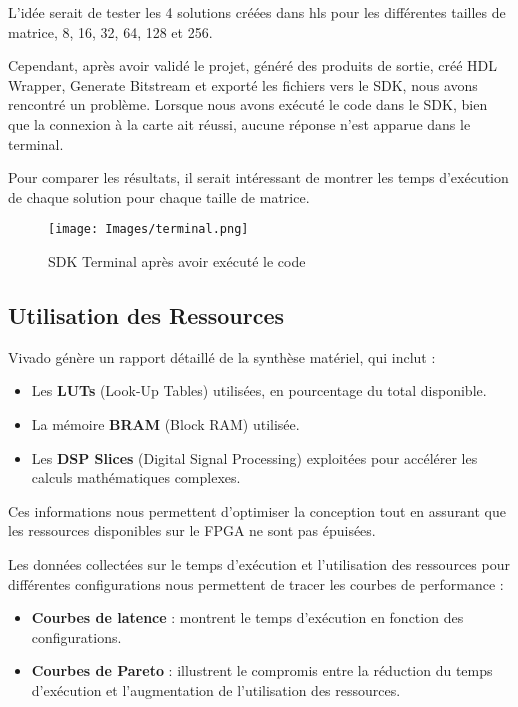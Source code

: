 \documentclass[../CSC_5RO06_TA.tex]{subfiles}
\begin{document}
L'idée serait de tester les 4 solutions créées dans hls pour les différentes tailles de matrice, 8, 16, 32, 64, 128 et 256.

Cependant, après avoir validé le projet, généré des produits de sortie, créé HDL Wrapper, Generate Bitstream et exporté les fichiers vers le SDK, nous avons rencontré un problème. Lorsque nous avons exécuté le code dans le SDK, bien que la connexion à la carte ait réussi, aucune réponse n'est apparue dans le terminal.

Pour comparer les résultats, il serait intéressant de montrer les temps d'exécution de chaque solution pour chaque taille de matrice.

\begin{figure}[H]
    \centering
    \texttt{[image: Images/terminal.png]}
    \caption{SDK Terminal après avoir exécuté le code}
\end{figure}

\subsection{Utilisation des Ressources}

Vivado génère un rapport détaillé de la synthèse matériel, qui inclut :
\begin{itemize}
    \item Les \textbf{LUTs} (Look-Up Tables) utilisées, en pourcentage du total disponible.
    \item La mémoire \textbf{BRAM} (Block RAM) utilisée.
    \item Les \textbf{DSP Slices} (Digital Signal Processing) exploitées pour accélérer les calculs mathématiques complexes.
\end{itemize}

Ces informations nous permettent d'optimiser la conception tout en assurant que les ressources disponibles sur le FPGA ne sont pas épuisées.

Les données collectées sur le temps d'exécution et l'utilisation des ressources pour différentes configurations nous permettent de tracer les courbes de performance :
\begin{itemize}
    \item \textbf{Courbes de latence} : montrent le temps d'exécution en fonction des configurations.
    \item \textbf{Courbes de Pareto} : illustrent le compromis entre la réduction du temps d'exécution et l'augmentation de l'utilisation des ressources.
\end{itemize}
\end{document}
